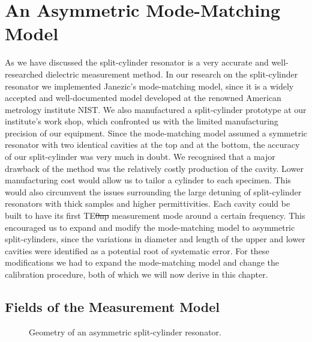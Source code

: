 \chapter{An Asymmetric Mode-Matching Model}\label{ch:m12}
As we have discussed the split-cylinder resonator is a very accurate and well-researched dielectric measurement method. In our research on the split-cylinder resonator we implemented Janezic's mode-matching model, since it is a widely accepted and well-documented model developed at the renowned American metrology institute NIST. We also manufactured a split-cylinder prototype at our institute's work shop, which confronted us with the limited manufacturing precision of our equipment. Since the mode-matching model assumed a symmetric resonator with two identical cavities at the top and at the bottom, the accuracy of our split-cylinder was very much in doubt. We recognised that a major drawback of the method was the relatively costly production of the cavity. Lower manufacturing cost would allow us to tailor a cylinder to each specimen. This would also circumvent the issues surrounding the large detuning of split-cylinder resonators with thick samples and higher permittivities. Each cavity could be built to have its first TE\st{0np} measurement mode around a certain frequency. This encouraged us to expand and modify the mode-matching model to asymmetric split-cylinders, since the variations in diameter and length of the upper and lower cavities were identified as a potential root of systematic error. For these modifications we had to expand the mode-matching model and change the calibration procedure, both of which we will now derive in this chapter. 
\section{Fields of the Measurement Model}
\begin{figure}
\centering
{}
\caption{Geometry of an asymmetric split-cylinder resonator.}\label{fig:a_SC}
\end{figure}

